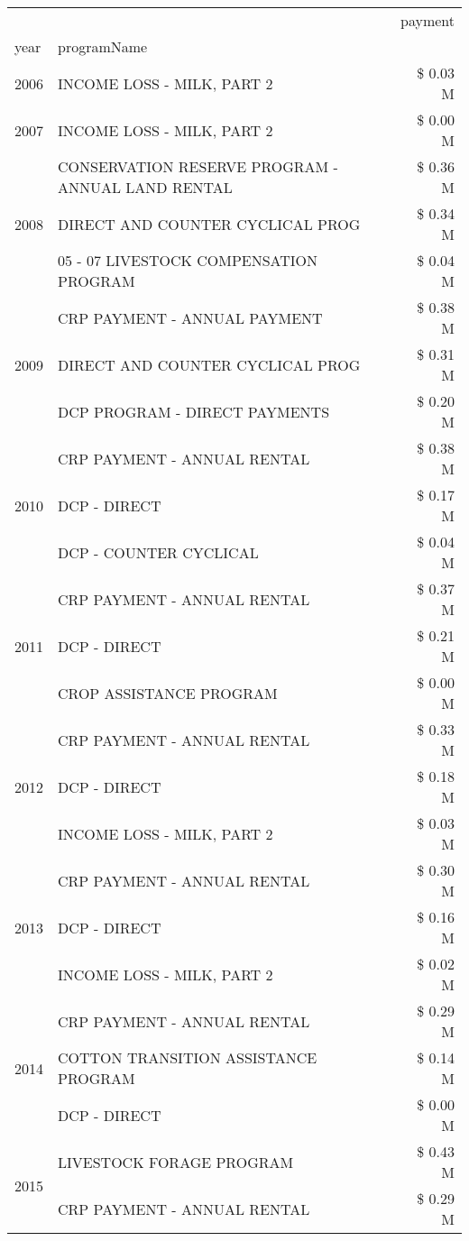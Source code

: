 \begin{tabular}{llr}
\toprule
 &  & payment \\
year & programName &  \\
\midrule
2006 & INCOME LOSS - MILK, PART 2 & \$ 0.03 M \\
\cline{1-3}
2007 & INCOME LOSS - MILK, PART 2 & \$ 0.00 M \\
\cline{1-3}
\multirow[t]{3}{*}{2008} & CONSERVATION RESERVE PROGRAM - ANNUAL LAND RENTAL & \$ 0.36 M \\
 & DIRECT AND COUNTER CYCLICAL PROG & \$ 0.34 M \\
 & 05 - 07 LIVESTOCK COMPENSATION PROGRAM & \$ 0.04 M \\
\cline{1-3}
\multirow[t]{3}{*}{2009} & CRP PAYMENT - ANNUAL PAYMENT & \$ 0.38 M \\
 & DIRECT AND COUNTER CYCLICAL PROG & \$ 0.31 M \\
 & DCP PROGRAM - DIRECT PAYMENTS & \$ 0.20 M \\
\cline{1-3}
\multirow[t]{3}{*}{2010} & CRP PAYMENT - ANNUAL RENTAL & \$ 0.38 M \\
 & DCP - DIRECT & \$ 0.17 M \\
 & DCP - COUNTER CYCLICAL & \$ 0.04 M \\
\cline{1-3}
\multirow[t]{3}{*}{2011} & CRP PAYMENT - ANNUAL RENTAL & \$ 0.37 M \\
 & DCP - DIRECT & \$ 0.21 M \\
 & CROP ASSISTANCE PROGRAM & \$ 0.00 M \\
\cline{1-3}
\multirow[t]{3}{*}{2012} & CRP PAYMENT - ANNUAL RENTAL & \$ 0.33 M \\
 & DCP - DIRECT & \$ 0.18 M \\
 & INCOME LOSS - MILK, PART 2 & \$ 0.03 M \\
\cline{1-3}
\multirow[t]{3}{*}{2013} & CRP PAYMENT - ANNUAL RENTAL & \$ 0.30 M \\
 & DCP - DIRECT & \$ 0.16 M \\
 & INCOME LOSS - MILK, PART 2 & \$ 0.02 M \\
\cline{1-3}
\multirow[t]{3}{*}{2014} & CRP PAYMENT - ANNUAL RENTAL & \$ 0.29 M \\
 & COTTON TRANSITION ASSISTANCE PROGRAM & \$ 0.14 M \\
 & DCP - DIRECT & \$ 0.00 M \\
\cline{1-3}
\multirow[t]{3}{*}{2015} & LIVESTOCK FORAGE PROGRAM & \$ 0.43 M \\
 & CRP PAYMENT - ANNUAL RENTAL & \$ 0.29 M \\

\end{tabular}
